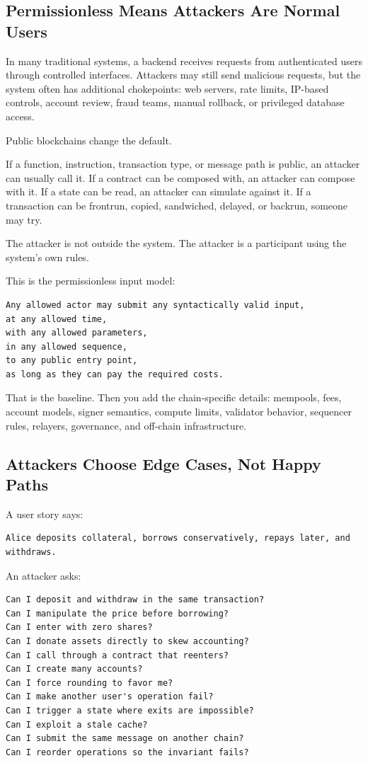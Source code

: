 \subsection{Permissionless Means Attackers Are Normal Users}

In many traditional systems, a backend receives requests from
authenticated users through controlled interfaces. Attackers may still
send malicious requests, but the system often has additional
chokepoints: web servers, rate limits, IP-based controls, account
review, fraud teams, manual rollback, or privileged database access.

Public blockchains change the default.

If a function, instruction, transaction type, or message path is public,
an attacker can usually call it. If a contract can be composed with, an
attacker can compose with it. If a state can be read, an attacker can
simulate against it. If a transaction can be frontrun, copied,
sandwiched, delayed, or backrun, someone may try.

The attacker is not outside the system. The attacker is a participant
using the system's own rules.

This is the permissionless input model:

\begin{lstlisting}
Any allowed actor may submit any syntactically valid input,
at any allowed time,
with any allowed parameters,
in any allowed sequence,
to any public entry point,
as long as they can pay the required costs.
\end{lstlisting}

That is the baseline. Then you add the chain-specific details: mempools,
fees, account models, signer semantics, compute limits, validator
behavior, sequencer rules, relayers, governance, and off-chain
infrastructure.

\subsection{Attackers Choose Edge Cases, Not Happy Paths}

A user story says:

\begin{lstlisting}
Alice deposits collateral, borrows conservatively, repays later, and withdraws.
\end{lstlisting}

An attacker asks:

\begin{lstlisting}
Can I deposit and withdraw in the same transaction?
Can I manipulate the price before borrowing?
Can I enter with zero shares?
Can I donate assets directly to skew accounting?
Can I call through a contract that reenters?
Can I create many accounts?
Can I force rounding to favor me?
Can I make another user's operation fail?
Can I trigger a state where exits are impossible?
Can I exploit a stale cache?
Can I submit the same message on another chain?
Can I reorder operations so the invariant fails?
\end{lstlisting}

